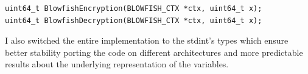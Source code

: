 \begin{center}
\begin{lstlisting}
uint64_t BlowfishEncryption(BLOWFISH_CTX *ctx, uint64_t x);
uint64_t BlowfishDecryption(BLOWFISH_CTX *ctx, uint64_t x);
\end{lstlisting}
\end{center}

I also switched the entire implementation to the stdint's types which ensure better stability porting the code on different architectures and more predictable results about the underlying representation of the variables.

